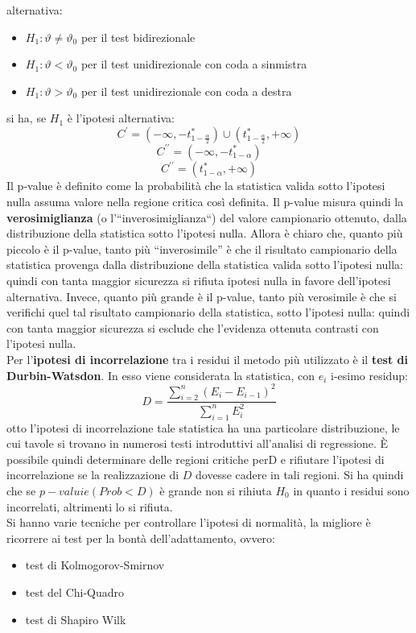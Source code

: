 \documentclass[a4paper,12pt, oneside]{book}
\begin{document}
alternativa:
\begin{itemize}
\item $H_{1} : \vartheta \neq \vartheta_{0}$ per il test bidirezionale
\item $H_{1} : \vartheta<\vartheta_{0}$ per il test unidirezionale con coda a sinmistra
\item $H_{1} : \vartheta>\vartheta_{0}$ per il test unidirezionale con coda a destra
\end{itemize}
si ha, se $H_1$ è l'ipotesi alternativa:
\[C^{\prime}=\left(-\infty,-t_{1-\frac{\alpha}{2}}^{*}\right) \cup\left(t_{1-\frac{\alpha}{2}}^{*},+\infty\right)\]
\[C^{\prime \prime}=\left(-\infty,-t_{1-\alpha}^{*}\right)\]
\[C^{\prime \prime}=\left(t_{1-\alpha}^{*},+\infty\right)\]
Il p-value è definito come la probabilità che la statistica valida sotto l’ipotesi nulla assuma
valore nella regione critica così definita.
Il p-value misura quindi la \textbf{verosimiglianza} (o l’“inverosimiglianza“) del valore
campionario ottenuto, dalla distribuzione della statistica sotto l’ipotesi nulla.
Allora è chiaro che, quanto più piccolo è il p-value, tanto più “inverosimile” è che il
risultato campionario della statistica provenga dalla distribuzione della statistica valida sotto
l’ipotesi nulla: quindi con tanta maggior sicurezza si rifiuta ipotesi nulla in favore
dell’ipotesi alternativa.
Invece, quanto più grande è il p-value, tanto più verosimile è che si verifichi quel tal
risultato campionario della statistica, sotto l’ipotesi nulla: quindi con tanta maggior
sicurezza si esclude che l’evidenza ottenuta contrasti con l’ipotesi nulla.\\
Per l'\textbf{ipotesi di incorrelazione} tra i residui il metodo più utilizzato è il \textbf{test di Durbin-Watsdon}. In esso viene considerata la statistica, con $e_i$ i-esimo residup:
\[D=\frac{\sum_{i=2}^{n}\left(E_{i}-E_{i-1}\right)^{2}}{\sum_{i=1}^{n} E_{i}^{2}}\]
otto l’ipotesi di incorrelazione tale statistica ha una particolare distribuzione, le cui
tavole si trovano in numerosi testi introduttivi all’analisi di regressione.
È possibile quindi determinare delle regioni critiche per$ $D e rifiutare l’ipotesi di
incorrelazione se la realizzazione di $D$ dovesse cadere in tali regioni. Si ha quindi che se $p-valuie(Prob<D)$ è grande non si rihiuta $H_0$ in quanto i residui sono incorrelati, altrimenti lo si rifiuta.
\\Si hanno varie tecniche per controllare l'ipotesi di normalità, la migliore è ricorrere ai test per la bontà dell'adattamento, ovvero:
\begin{itemize}
\item test di Kolmogorov-Smirnov
\item test del Chi-Quadro
\item test di Shapiro Wilk
\end{itemize}
\end{document}
